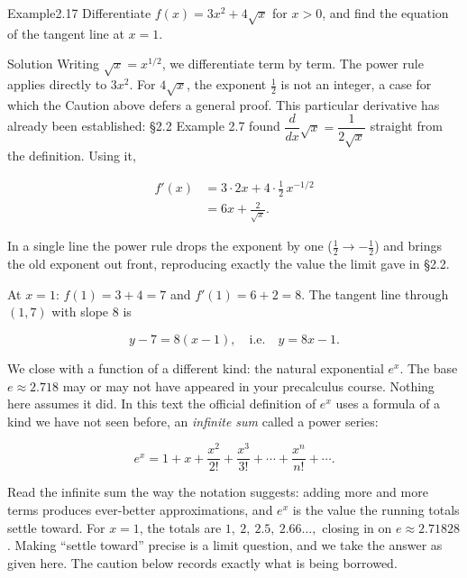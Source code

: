 \documentclass[a4paper,12pt,oneside]{memoir}
\begin{document}
\begin{workedexample}
\begin{envexample}{Example}{2.17}{}
Differentiate \(f(x) = 3x^{2} + 4\sqrt{x}\) for \(x > 0\), and find the equation of the tangent line at \(x = 1\).
\end{envexample}
\begin{envsolution}{Solution}{}{}
Writing \(\sqrt{x} = x^{1/2}\), we differentiate term by term. The power rule applies directly to \(3x^{2}\). For \(4\sqrt{x}\), the exponent \(\tfrac{1}{2}\) is not an integer, a case for which the Caution above defers a general proof. This particular derivative has already been established: §2.2 Example 2.7 found \(\dfrac{d}{dx}\sqrt{x} = \dfrac{1}{2\sqrt{x}}\) straight from the definition. Using it,

\[ \begin{aligned}
          f'(x) &= 3 \cdot 2x + 4 \cdot \tfrac{1}{2}\,x^{-1/2} \\[2pt]
                &= 6x + \frac{2}{\sqrt{x}}.
        \end{aligned} \]

In a single line the power rule drops the exponent by one (\(\tfrac{1}{2} \to -\tfrac{1}{2}\)) and brings the old exponent out front, reproducing exactly the value the limit gave in §2.2.

At \(x = 1\): \(f(1) = 3 + 4 = 7\) and \(f'(1) = 6 + 2 = 8\). The tangent line through \((1, 7)\) with slope \(8\) is

\[ y - 7 = 8(x - 1), \quad\text{i.e.}\quad y = 8x - 1. \]
\end{envsolution}
\end{workedexample}
We close with a function of a different kind: the natural exponential \(e^{x}\). The base \(e \approx 2.718\) may or may not have appeared in your precalculus course. Nothing here assumes it did. In this text the official definition of \(e^{x}\) uses a formula of a kind we have not seen before, an \emph{infinite sum} called a power series:

\[ e^{x} = 1 + x + \frac{x^{2}}{2!} + \frac{x^{3}}{3!} + \cdots + \frac{x^{n}}{n!} + \cdots. \]

Read the infinite sum the way the notation suggests: adding more and more terms produces ever-better approximations, and \(e^{x}\) is the value the running totals settle toward. For \(x = 1\), the totals are \(1,\ 2,\ 2.5,\ 2.66\ldots,\) closing in on \(e \approx 2.71828\). Making “settle toward” precise is a limit question, and we take the answer as given here. The caution below records exactly what is being borrowed.
\end{document}
